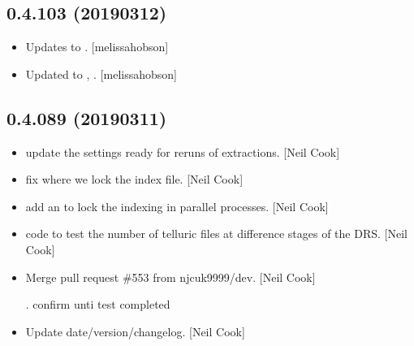\documentclass[a4paper,10pt,english]{report}
\begin{document}
\subsection{0.4.103 (2019\sphinxhyphen{}03\sphinxhyphen{}12)}
\label{\detokenize{misc/changelog:id190}}\begin{itemize}
\item {} 
Updates to . {[}melissa\sphinxhyphen{}hobson{]}

\item {} 
Updated to , . {[}melissa\sphinxhyphen{}hobson{]}

\end{itemize}


\subsection{0.4.089 (2019\sphinxhyphen{}03\sphinxhyphen{}11)}
\label{\detokenize{misc/changelog:id191}}\begin{itemize}
\item {} 
 \sphinxhyphen{} update the settings ready for re\sphinxhyphen{}runs of
extractions. {[}Neil Cook{]}

\item {} 
 \sphinxhyphen{} fix where we lock the index file. {[}Neil Cook{]}

\item {} 
 \sphinxhyphen{} add an  to lock the indexing in
parallel processes. {[}Neil Cook{]}

\item {} 
 \sphinxhyphen{} code to test the number of telluric files
at difference stages of the DRS. {[}Neil Cook{]}

\item {} 
Merge pull request \#553 from njcuk9999/dev. {[}Neil Cook{]}

. confirm unti test completed

\item {} 
Update date/version/changelog. {[}Neil Cook{]}

\end{itemize}
\end{document}
